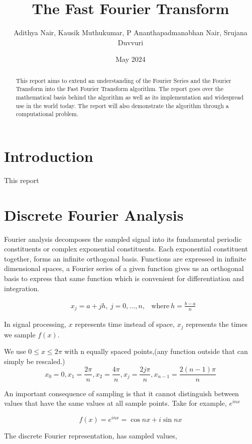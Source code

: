 \documentclass[11pt]{amsart}
\title{The Fast Fourier Transform}
\author{Adithya Nair, Kausik Muthukumar, P Ananthapadmanabhan Nair, Srujana Duvvuri}
\date{May 2024}
\theoremstyle{definition}
\theoremstyle{remark}
\numberwithin{equation}{section}
\begin{document}
\begin{abstract}
	This report aims to extend an understanding of the Fourier Series and the Fourier Transform into the Fast Fourier Transform algorithm. The report goes over the mathematical basis behind the algorithm as well as its implementation and widespread use in the world today. The report will also demonstrate the algorithm through a computational problem.
\end{abstract}

\maketitle

\section{Introduction}\label{sec1}
This report  

\section{Discrete Fourier Analysis}
Fourier analysis decomposes the sampled signal into its fundamental periodic constituents or complex exponential constituents. Each exponential constituent together, forms an infinite orthogonal basis. Functions are expressed in infinite dimensional spaces, a Fourier series of a given function gives us an orthogonal basis to express that same function which is convenient for differentiation and integration.

\begin{align*}
	&x_j = a + jh, \ j = 0, \dots, n, & \text{where} \ h = \frac{b-a}{n}
\end{align*}

In signal processing, $x$ represents time instead of space, $x_j$ represents the times we sample $f(x)$.

We use $0 \leq x \leq 2 \pi$ with n equally spaced points,(any function outside that can simply be rescaled.)
\[ 
	x_0 = 0, x_1 = \frac{2\pi}{n}, x_2 = \frac{4\pi}{n}, x_j = \frac{2j\pi}{n}, x_{n-1} = \frac{2(n-1)\pi}{n}
\]

An important consequence of sampling is that it cannot distinguish between values that have the same values at all sample points.
Take for example, $e^{inx}$

\[
	f(x) = e^{inx} = \cos{nx} + i \sin{nx}
\]


The discrete Fourier representation, has sampled values,
\end{document}
